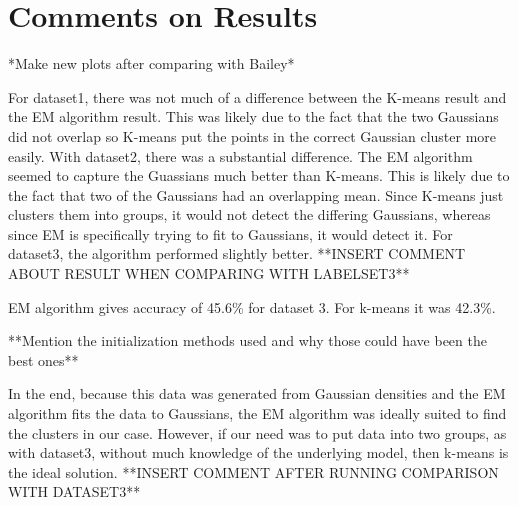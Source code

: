 \documentclass[11pt,psfig]{article}
\begin{document}
\section*{Comments on Results}

*Make new plots after comparing with Bailey*

For dataset1, there was not much of a difference between the K-means result and the EM algorithm result. This was likely due to the fact that the two Gaussians did not overlap so K-means put the points in the correct Gaussian cluster more easily. With dataset2, there was a substantial difference. The EM algorithm seemed to capture the Guassians much better than K-means. This is likely due to the fact that two of the Gaussians had an overlapping mean. Since K-means just clusters them into groups, it would not detect the differing Gaussians, whereas since EM is specifically trying to fit to Gaussians, it would detect it. For dataset3, the algorithm performed slightly better. **INSERT COMMENT ABOUT RESULT WHEN COMPARING WITH LABELSET3**

EM algorithm gives accuracy of 45.6\% for dataset 3. For k-means it was 42.3\%. 

**Mention the initialization methods used and why those could have been the best ones**

In the end, because this data was generated from Gaussian densities and the EM algorithm fits the data to Gaussians, the EM algorithm was ideally suited to find the clusters in our case. However, if our need was to put data into two groups, as with dataset3, without much knowledge of the underlying model, then k-means is the ideal solution. **INSERT COMMENT AFTER RUNNING COMPARISON WITH DATASET3**
\end{document}
